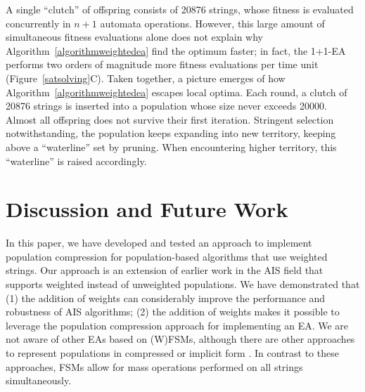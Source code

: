 \documentclass{llncs}
\begin{document}
A single ``clutch'' of offspring consists of 20876 strings,
whose fitness is evaluated concurrently in $n+1$ automata operations.
However, this large amount of simultaneous fitness evaluations alone does not 
explain why Algorithm~\ref{algorithmweightedea} find the optimum faster;
in fact, the 1+1-EA performs two orders of magnitude more fitness evaluations
per time unit (Figure~\ref{satsolving}C).
%
Taken together, a picture emerges of how
Algorithm~\ref{algorithmweightedea} escapes local optima.
Each round, a clutch of 20876 strings is inserted into a population
whose size never exceeds 20000.
Almost all offspring does not survive their first iteration.
Stringent selection notwithstanding,
the population keeps expanding into new territory,
keeping above a ``waterline'' set by pruning.
When encountering higher territory,
this ``waterline'' is raised accordingly.

\label{sectionwaga}
\section{Discussion and Future Work}

In this paper, we have developed and tested an approach to implement
population compression for population-based algorithms that use
weighted strings. Our approach is an extension of earlier work in the
AIS field \cite{Liskiewicz2010} that supports weighted instead of
unweighted populations. We have demonstrated that (1) the addition of
weights can considerably improve the performance and robustness of AIS
algorithms; (2) the addition of weights makes it possible to leverage
the population compression approach for implementing an EA. 
We are not aware of other EAs based on (W)FSMs, although 
there are other approaches to represent populations
in compressed or implicit form \cite{Baluja1995,Harik1999,Manso2009}.
In contrast to these approaches, FSMs allow for mass operations performed on
all strings simultaneously. 

\end{document}

